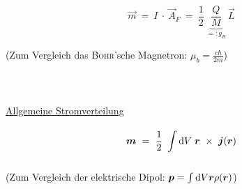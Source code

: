 \begin{equation*}
\vec{m}  \ =\ I \ \cdot \ \vec{A}_F \ = \ \frac{1}{2} \ \underbrace{\frac{Q}{M}}_{=: g_B} \ \vec{L}
\end{equation*}

(Zum Vergleich das \textsc{Bohr}'sche Magnetron: $\mu_b = \frac{e\hbar}{2m}$)
\ \\
\ \\
\ \\
\ \\
\underline{Allgemeine Stromverteilung}


\begin{equation*}
\bm{m} \ = \ \frac{1}{2} \ \int\limits_{{}}^{{}}\mathrm{d}{V} \; \bm{r}\ \times \ \bm{j}(\bm{r})
\end{equation*}

(Zum Vergleich der elektrische Dipol: $\bm{p} = \int\limits_{{}}^{{}}\mathrm{d}{V} \bm{r}\rho(\bm{r})$)
